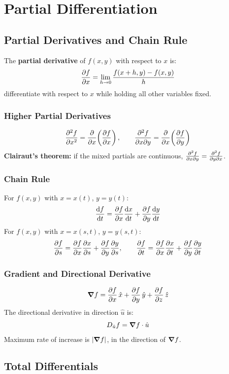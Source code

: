 \documentclass[11pt, letterpaper]{article}
\theoremstyle{plain}
\begin{document}
\newpage

\section{Partial Differentiation}              %

\subsection{Partial Derivatives and Chain Rule}

The \textbf{partial derivative} of $f(x,y)$ with respect to $x$ is:
\[
    \pdv{f}{x} = \lim_{h\to 0}\frac{f(x+h,y) - f(x,y)}{h}
\]
differentiate with respect to $x$ while holding all other variables fixed.

\subsubsection*{Higher Partial Derivatives}
\[
    \pdv[2]{f}{x} = \pdv{}{x}\!\left(\pdv{f}{x}\right), \qquad
    \pdv{f}{x}{y} = \pdv{}{x}\!\left(\pdv{f}{y}\right)
\]
\textbf{Clairaut's theorem:} if the mixed partials are continuous,
$\pdv{f}{x}{y} = \pdv{f}{y}{x}$.

\subsubsection*{Chain Rule}
For $f(x,y)$ with $x = x(t)$, $y = y(t)$:
\[
    \dv{f}{t} = \pdv{f}{x}\dv{x}{t} + \pdv{f}{y}\dv{y}{t}
\]
For $f(x,y)$ with $x = x(s,t)$, $y = y(s,t)$:
\[
    \pdv{f}{s} = \pdv{f}{x}\pdv{x}{s} + \pdv{f}{y}\pdv{y}{s}, \qquad
    \pdv{f}{t} = \pdv{f}{x}\pdv{x}{t} + \pdv{f}{y}\pdv{y}{t}
\]

\subsubsection*{Gradient and Directional Derivative}
\[
    \grad f = \pdv{f}{x}\,\hat{x} + \pdv{f}{y}\,\hat{y} + \pdv{f}{z}\,\hat{z}
\]
The directional derivative in direction $\hat{u}$ is:
\[
    D_{\hat{u}}f = \grad f \cdot \hat{u}
\]
Maximum rate of increase is $|\grad f|$, in the direction of $\grad f$.


\subsection{Total Differentials}
\end{document}
